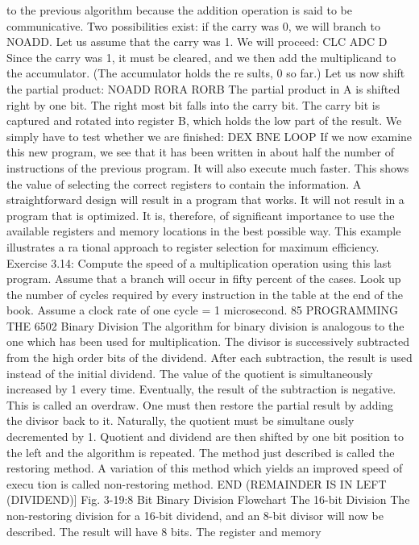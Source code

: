 \documentclass{book}
\begin{document}
to the previous algorithm because the addition operation is said
to be communicative.
Two possibilities exist: if the carry was 0, we will branch to
NOADD. Let us assume that the carry was 1. We will proceed:
CLC
ADC D
Since the carry was 1, it must be cleared, and we then add the
multiplicand to the accumulator. (The accumulator holds the re
sults, 0 so far.)
Let us now shift the partial product:
NOADD RORA
RORB
The partial product in A is shifted right by one bit. The right
most bit falls into the carry bit. The carry bit is captured and
rotated into register B, which holds the low part of the result.
We simply have to test whether we are finished:
DEX
BNE LOOP
If we now examine this new program, we see that it has been
written in about half the number of instructions of the previous
program. It will also execute much faster. This shows the value of
selecting the correct registers to contain the information.
A straightforward design will result in a program that works. It
will not result in a program that is optimized. It is, therefore, of
significant importance to use the available registers and memory
locations in the best possible way. This example illustrates a ra
tional approach to register selection for maximum efficiency.
Exercise 3.14: Compute the speed of a multiplication operation
using this last program. Assume that a branch will occur in fifty
percent of the cases. Look up the number of cycles required by every
instruction in the table at the end of the book. Assume a clock rate
of one cycle = 1 microsecond.
85
PROGRAMMING THE 6502
Binary Division
The algorithm for binary division is analogous to the one which
has been used for multiplication. The divisor is successively
subtracted from the high order bits of the dividend. After each
subtraction, the result is used instead of the initial dividend. The
value of the quotient is simultaneously increased by 1 every time.
Eventually, the result of the subtraction is negative. This is called
an overdraw. One must then restore the partial result by adding
the divisor back to it. Naturally, the quotient must be simultane
ously decremented by 1. Quotient and dividend are then shifted
by one bit position to the left and the algorithm is repeated.
The method just described is called the restoring method. A
variation of this method which yields an improved speed of execu
tion is called non-restoring method.
END (REMAINDER IS IN LEFT (DIVIDEND)]
Fig. 3-19:8 Bit Binary Division Flowchart
The 16-bit Division
The non-restoring division for a 16-bit dividend, and an 8-bit divisor
will now be described. The result will have 8 bits. The register and memory
\end{document}
